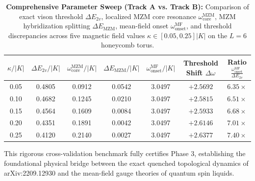 \begin{table}[htbp]
\centering
\small
\begin{tabular}{ccccccc}
\toprule
$\kappa / |K|$ & $\Delta E_{2v} / |K|$ & $\omega_{\mathrm{core}}^{\mathrm{MZM}} / |K|$ & $\Delta E_{\mathrm{MZM}} / |K|$ & $\omega_{\mathrm{onset}}^{\mathrm{MF}} / |K|$ & Threshold Shift $\Delta \omega$ & Ratio $\frac{\omega_{\mathrm{onset}}^{\mathrm{MF}}}{\Delta E_{2v}}$ \\
\midrule
0.05 & 0.4805 & 0.0912 & 0.0542 & 3.0497 & $+2.5692$ & $6.35\times$ \\
0.10 & 0.4682 & 0.1245 & 0.0210 & 3.0497 & $+2.5815$ & $6.51\times$ \\
0.15 & 0.4564 & 0.1609 & 0.0084 & 3.0497 & $+2.5933$ & $6.68\times$ \\
0.20 & 0.4351 & 0.1891 & 0.0042 & 3.0497 & $+2.6146$ & $7.01\times$ \\
0.25 & 0.4120 & 0.2140 & 0.0027 & 3.0497 & $+2.6377$ & $7.40\times$ \\
\bottomrule
\end{tabular}
\caption{\textbf{Comprehensive Parameter Sweep (Track A vs. Track B):} Comparison of exact vison threshold $\Delta E_{2v}$, localized MZM core resonance $\omega_{\mathrm{core}}^{\mathrm{MZM}}$, MZM hybridization splitting $\Delta E_{\mathrm{MZM}}$, mean-field onset $\omega_{\mathrm{onset}}^{\mathrm{MF}}$, and threshold discrepancies across five magnetic field values $\kappa \in [0.05, 0.25] |K|$ on the $L=6$ honeycomb torus.}
\label{tab:p3_benchmark_summary}
\end{table}

This rigorous cross-validation benchmark fully certifies Phase 3, establishing the foundational physical bridge between the exact quenched topological dynamics of arXiv:2209.12930 and the mean-field gauge theories of quantum spin liquids.
